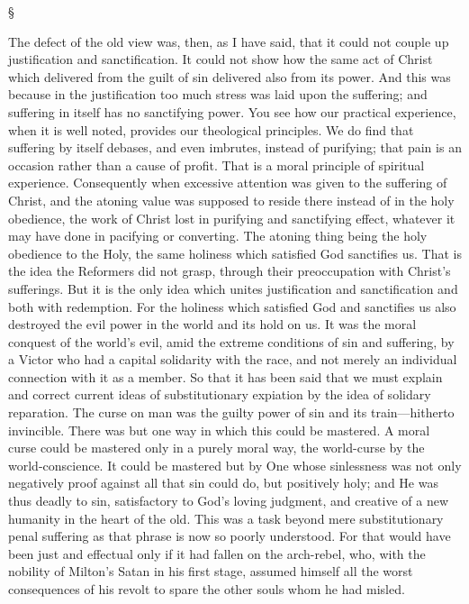 \documentclass[12pt,letterpaper,oneside]{book}
\begin{document}
\begin{center}
\S
\end{center}

The defect of the old view was, then, as I have 
said, that it could not couple up justification 
and sanctification. It could not show how the 
same act of Christ which delivered from the 
guilt of sin delivered also from its power. And 
this was because in the justification too much 
stress was laid upon the suffering; and suffering 
in itself has no sanctifying power. You see how 
our practical experience, when it is well noted, 
provides our theological principles. We do 
find that suffering by itself debases, and even 
imbrutes, instead of purifying; that pain is an 
occasion rather than a cause of profit. That is 
a moral principle of spiritual experience. Consequently 
when excessive attention was given to 
the suffering of Christ, and the atoning value 
was supposed to reside there instead of in the 
holy obedience, the work of Christ lost in purifying 
and sanctifying effect, whatever it may 
have done in pacifying or converting. The 
atoning thing being the holy obedience to the 
Holy, the same holiness which satisfied God 
sanctifies us. That is the idea the Reformers 
did not grasp, through their preoccupation 
with Christ's sufferings. But it is the only 
idea which unites justification and sanctification 
and both with redemption. For the holiness 
which satisfied God and sanctifies us also 
destroyed the evil power in the world and 
its hold on us. It was the moral conquest 
of the world's evil, amid the extreme conditions 
of sin and suffering, by a Victor who 
had a capital solidarity with the race, and not 
merely an individual connection with it as a 
member. So that it has been said that we 
must explain and correct current ideas of substitutionary 
expiation by the idea of solidary 
reparation. The curse on man was the guilty 
power of sin and its train---hitherto invincible. 
There was but one way in which this could be 
mastered. A moral curse could be mastered 
only in a purely moral way, the world-curse 
by the world-conscience. It could be mastered 
but by One whose sinlessness was not only 
negatively proof against all that sin could do, 
but positively holy; and He was thus deadly to 
sin, satisfactory to God's loving judgment, and 
creative of a new humanity in the heart of the 
old. This was a task beyond mere substitutionary 
penal suffering as that phrase is now so 
poorly understood. For that would have been 
just and effectual only if it had fallen on the 
arch-rebel, who, with the nobility of Milton's 
Satan in his first stage, assumed himself all the 
worst consequences of his revolt to spare the 
other souls whom he had misled. 
\end{document}
